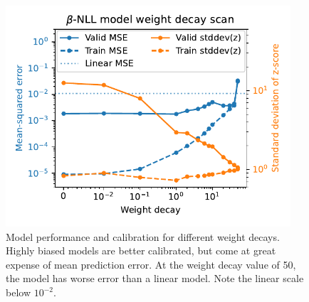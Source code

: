 


\begin{figure}
	\centering
	\includegraphics[width=300pt]{figures/beta-NLL_wd_model_performance.pdf}
	\caption[Model performance and calibration for different weight decays]{\label{fig:beta-NLL_wd_model_performance}Model performance and calibration for different weight decays. Highly biased models are better calibrated, but come at great expense of mean prediction error. At the weight decay value of 50, the model has worse error than a linear model. Note the linear scale below $10^{-2}$.}
\end{figure}

